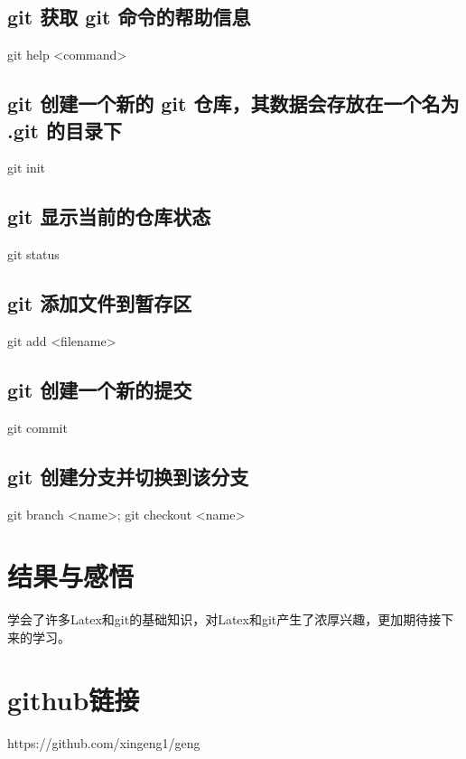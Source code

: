 \documentclass{article}
\begin{document}
\subsection{git 获取 git 命令的帮助信息}
git help <command>
\subsection{git 创建一个新的 git 仓库，其数据会存放在一个名为 .git 的目录下}
git init
\subsection{git 显示当前的仓库状态}
git status
\subsection{git 添加文件到暂存区}
git add <filename>
\subsection{git 创建一个新的提交}
git commit
\subsection{git 创建分支并切换到该分支}
git branch <name>; git checkout <name>
\section{ \LARGE 结果与感悟}
学会了许多Latex和git的基础知识，对Latex和git产生了浓厚兴趣，更加期待接下来的学习。
\section{ \LARGE github链接}
https://github.com/xingeng1/geng
\end{document}
